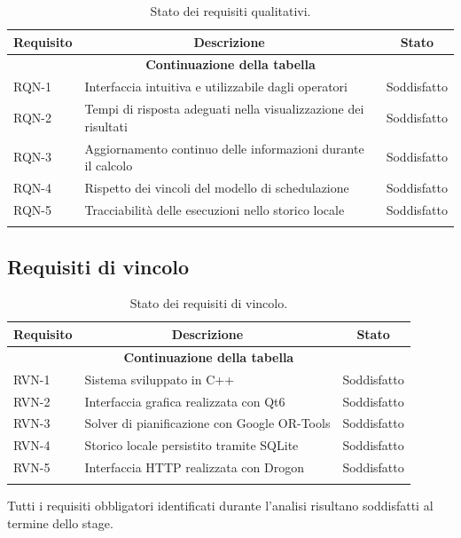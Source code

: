 \begin{center}
\begin{longtable}{|p{2.1cm}|p{7.5cm}|p{2.4cm}|}
\hline
\multicolumn{1}{|c|}{\textbf{Requisito}} &
\multicolumn{1}{c|}{\textbf{Descrizione}} &
\multicolumn{1}{c|}{\textbf{Stato}} \\
\hline
\endfirsthead
\hline
\multicolumn{3}{c}{{\bfseries Continuazione della tabella}}\\
\hline
\endhead

RQN-1 & Interfaccia intuitiva e utilizzabile dagli operatori & Soddisfatto \\
\hline
RQN-2 & Tempi di risposta adeguati nella visualizzazione dei risultati & Soddisfatto \\
\hline
RQN-3 & Aggiornamento continuo delle informazioni durante il calcolo & Soddisfatto \\
\hline
RQN-4 & Rispetto dei vincoli del modello di schedulazione & Soddisfatto \\
\hline
RQN-5 & Tracciabilità delle esecuzioni nello storico locale & Soddisfatto \\
\hline

\caption{Stato dei requisiti qualitativi.}
\label{tab:stato_requisiti_qualitativi}
\end{longtable}
\end{center}

\subsection{Requisiti di vincolo}

\begin{center}
\begin{longtable}{|p{2.1cm}|p{7.5cm}|p{2.4cm}|}
\hline
\multicolumn{1}{|c|}{\textbf{Requisito}} &
\multicolumn{1}{c|}{\textbf{Descrizione}} &
\multicolumn{1}{c|}{\textbf{Stato}} \\
\hline
\endfirsthead
\hline
\multicolumn{3}{c}{{\bfseries Continuazione della tabella}}\\
\hline
\endhead

RVN-1 & Sistema sviluppato in C++ & Soddisfatto \\
\hline
RVN-2 & Interfaccia grafica realizzata con Qt6 & Soddisfatto \\
\hline
RVN-3 & Solver di pianificazione con Google OR-Tools & Soddisfatto \\
\hline
RVN-4 & Storico locale persistito tramite SQLite & Soddisfatto \\
\hline
RVN-5 & Interfaccia HTTP realizzata con Drogon & Soddisfatto \\
\hline

\caption{Stato dei requisiti di vincolo.}
\label{tab:stato_requisiti_vincolo}
\end{longtable}
\end{center}

Tutti i requisiti obbligatori identificati durante l'analisi risultano soddisfatti al termine dello stage.

\newpage

